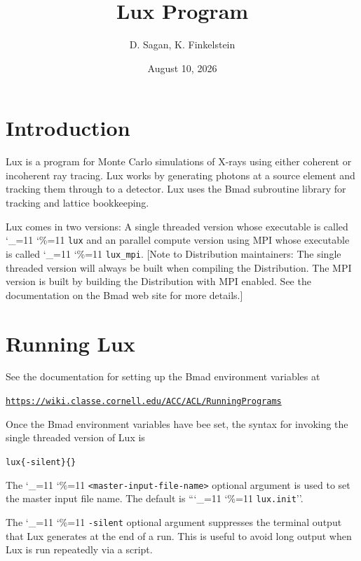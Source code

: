 \documentclass[11pt]{article}
\title{Lux Program}
\author{D. Sagan, K. Finkelstein}
\date{August 10, 2026}
\newcommand{\lux}{Lux\xspace}
\newcommand\ttcmd{\begingroup\catcode`\_=11 \catcode`\%=11 \dottcmd}  %
\newcommand\dottcmd[1]{\texttt{#1}\endgroup}
\newcommand{\vn}{\ttcmd}
\newenvironment{example}
  {\vspace{\ExBeg} \begin{alltt}}
  {\end{alltt} \vspace{\ExEnd}}
\newlength{\ExBeg}
\newlength{\ExEnd}
\begin{document}
\maketitle

\tableofcontents

\section{Introduction} 
\label{s:intro}

\lux is a program for Monte Carlo simulations of X-rays using either coherent or incoherent ray
tracing. \lux works by generating photons at a source element and tracking them through to a
detector. \lux uses the Bmad subroutine library\cite{b:bmad} for tracking and lattice bookkeeping.

\lux comes in two versions: A single threaded version whose executable is called \vn{lux} and an
parallel compute version using MPI whose executable is called \vn{lux_mpi}. [Note to Distribution
maintainers: The single threaded version will always be built when compiling the Distribution. The
MPI version is built by building the Distribution with MPI enabled. See the documentation on the
Bmad web site for more details.]

\section{Running \lux} 
\label{s:run}

See the documentation for setting up the Bmad environment variables at
\begin{example}
  \url{https://wiki.classe.cornell.edu/ACC/ACL/RunningPrograms}
\end{example}

Once the Bmad environment variables have bee set, the syntax for invoking the single threaded
version of \lux is
\begin{example}
  lux \{-silent\} \{<master-input-file-name>\}
\end{example}
The \vn{<master-input-file-name>} optional argument is used to set the master input file name. The
default is ``\vn{lux.init}''.

The \vn{-silent} optional argument suppresses the terminal output that \lux generates at the end of
a run. This is useful to avoid long output when \lux is run repeatedly via a script.
\end{document}

